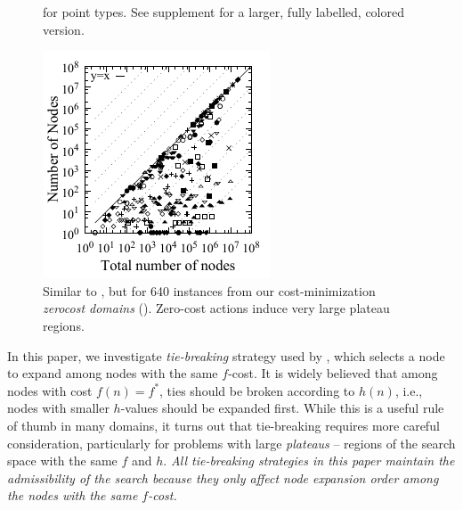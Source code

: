 \begin{figure}[bt]
\begin{minipage}[t]{\minilength}
{  for point types. See supplement for a larger, fully
  labelled, colored version.
  }
  \label{plateau}
 \end{minipage} 
 \hfill
 \begin{minipage}[t]{0.23\textwidth}
  \centering
  \includegraphics{tables/aaai16-frontier/zerocost/lmcut_frontier-front-mono.pdf}
  \caption{Similar to , but for 640 instances from our cost-minimization
  \emph{zerocost domains} ().
  Zero-cost actions induce very large plateau regions.
 }
 \label{plateau-zerocost}
 \end{minipage} 
\end{figure}

In this paper, we investigate \emph{tie-breaking} strategy used by
\astar, which selects a node to expand among nodes with the same
$f$-cost.  
It is widely believed that among nodes with
cost $f(n) = f^*$, ties should be broken according to $h(n)$, i.e.,
nodes with smaller $h$-values should be expanded first.  While this is a
useful rule of thumb in many domains, it turns out that tie-breaking
requires more careful consideration, particularly for problems with
large \emph{plateaus} -- regions of the search space with the same $f$ and $h$.
\emph{All tie-breaking strategies in this paper
maintain the admissibility of the search because they only affect node expansion
order among the nodes with the same $f$-cost.}


